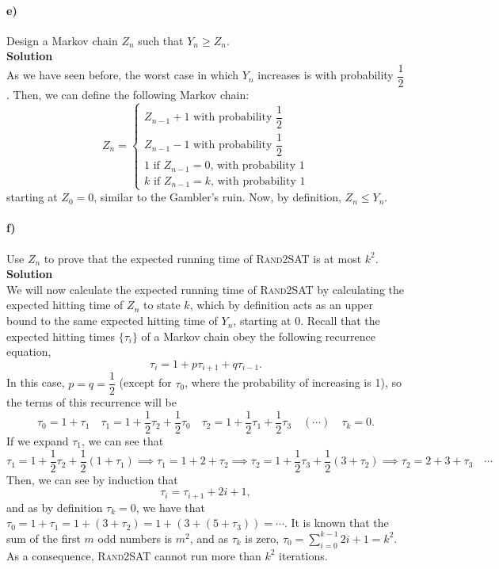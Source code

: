 \documentclass[10pt]{article}
\newcommand{\half}{\dfrac{1}{2}}
\begin{document}
\paragraph{e)} Design a Markov chain $Z_n$ such that $Y_n\geq Z_n$.\\ %
\textbf{Solution}\\
As we have seen before, the worst case in which $Y_n$ increases is with probability $\half$. Then, we can define the following Markov chain:
\[
Z_n=
\begin{cases}
Z_{n-1}+1\text{ with probability }\half\\
Z_{n-1}-1\text{ with probability }\half\\
1\text{ if }Z_{n-1}=0\text{, with probability 1}\\
k\text{ if }Z_{n-1}=k\text{, with probability 1}
\end{cases}
\]
starting at $Z_0=0$, similar to the Gambler's ruin. Now, by definition, $Z_n\leq Y_n$.
\newpage

\paragraph{f)} Use $Z_n$ to prove that the expected running time of \textsc{Rand2SAT} is at most $k^2$.\\
\textbf{Solution}\\
We will now calculate the expected running time of \textsc{Rand2SAT} by calculating the expected hitting time of $Z_n$ to state $k$, which by definition acts as an upper bound to the same expected hitting time of $Y_n$, starting at 0. Recall that the expected hitting times $\{\tau_i\}$ of a Markov chain obey the following recurrence equation,
\[
\tau_i=1+p\tau_{i+1}+q\tau_{i-1}.
\]
In this case, $p=q=\half$ (except for $\tau_0$, where the probability of increasing is 1), so the terms of this recurrence will be
\[
\tau_0=1+\tau_1\quad\tau_1=1+\half\tau_2+\half\tau_0\quad\tau_2=1+\half\tau_1+\half\tau_3\quad (\cdots)\quad \tau_k=0.
\]
If we expand $\tau_1$, we can see that
\[
\tau_1=1+\half\tau_2+\half(1+\tau_1)\implies\tau_1=1+2+\tau_2\implies\tau_2=1+\half\tau_3+\half(3+\tau_2)\implies\tau_2=2+3+\tau_3\quad\cdots
\]
Then, we can see by induction that
\[
\tau_i=\tau_{i+1}+2i+1,
\]
and as by definition $\tau_k=0$, we have that $\tau_0=1+\tau_1=1+(3+\tau_2)=1+(3+(5+\tau_3))=\cdots$. It is known that the sum of the first $m$ odd numbers is $m^2$, and as $\tau_k$ is zero, $\tau_0=\sum_{i=0}^{k-1} 2i+1=k^2$. As a consequence, \textsc{Rand2SAT} cannot run more than $k^2$ iterations.
\end{document}
